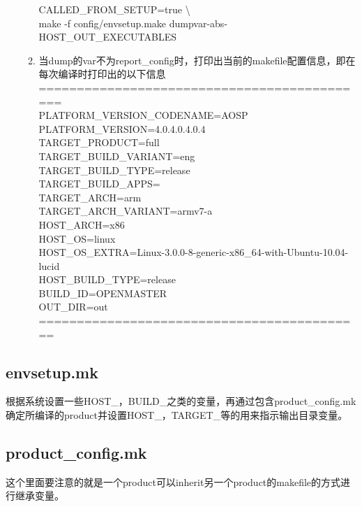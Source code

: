 \documentclass[a4paper,11pt]{article}
\begin{document}
\begin{CJK*}{UTF8}{gbsn}
\begin{enumerate}
\begin{enumerate}
              CALLED\_FROM\_SETUP=true \textbackslash \\
                make -f config/envsetup.make dumpvar-abs-HOST\_OUT\_EXECUTABLES \\
            \item 当dump的var不为report\_config时，打印出当前的makefile配置信息，即在每次编译时打印出的以下信息 \\
            ============================================ \\
            PLATFORM\_VERSION\_CODENAME=AOSP \\
            PLATFORM\_VERSION=4.0.4.0.4.0.4 \\
            TARGET\_PRODUCT=full \\
            TARGET\_BUILD\_VARIANT=eng \\
            TARGET\_BUILD\_TYPE=release \\
            TARGET\_BUILD\_APPS= \\
            TARGET\_ARCH=arm \\
            TARGET\_ARCH\_VARIANT=armv7-a \\
            HOST\_ARCH=x86 \\
            HOST\_OS=linux \\
            HOST\_OS\_EXTRA=Linux-3.0.0-8-generic-x86\_64-with-Ubuntu-10.04-lucid \\
            HOST\_BUILD\_TYPE=release \\
            BUILD\_ID=OPENMASTER \\
            OUT\_DIR=out \\
            =========================================== \\
        \end{enumerate} 
    \end{enumerate} 



    \subsection{envsetup.mk}
      根据系统设置一些HOST\_，BUILD\_之类的变量，再通过包含product\_config.mk确定所编译的product并设置HOST\_，TARGET\_等的用来指示输出目录变量。
    \subsection{product\_config.mk}
      这个里面要注意的就是一个product可以inherit另一个product的makefile的方式进行继承变量。


\end{CJK*}
\end{document}
